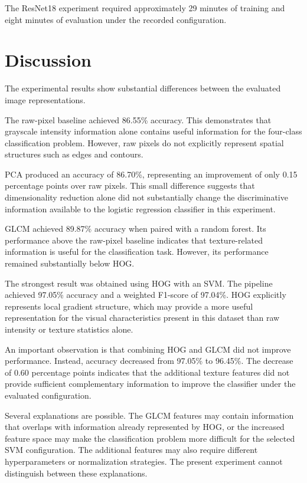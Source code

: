 \documentclass[11pt,a4paper]{article}
\begin{document}
The ResNet18 experiment required approximately 29 minutes of training and eight minutes of evaluation under the recorded configuration.


\section{Discussion}

The experimental results show substantial differences between the evaluated image representations.

The raw-pixel baseline achieved 86.55\% accuracy. This demonstrates that grayscale intensity information alone contains useful information for the four-class classification problem. However, raw pixels do not explicitly represent spatial structures such as edges and contours.

PCA produced an accuracy of 86.70\%, representing an improvement of only 0.15 percentage points over raw pixels. This small difference suggests that dimensionality reduction alone did not substantially change the discriminative information available to the logistic regression classifier in this experiment.

GLCM achieved 89.87\% accuracy when paired with a random forest. Its performance above the raw-pixel baseline indicates that texture-related information is useful for the classification task. However, its performance remained substantially below HOG.

The strongest result was obtained using HOG with an SVM. The pipeline achieved 97.05\% accuracy and a weighted F1-score of 97.04\%. HOG explicitly represents local gradient structure, which may provide a more useful representation for the visual characteristics present in this dataset than raw intensity or texture statistics alone.

An important observation is that combining HOG and GLCM did not improve performance. Instead, accuracy decreased from 97.05\% to 96.45\%. The decrease of 0.60 percentage points indicates that the additional texture features did not provide sufficient complementary information to improve the classifier under the evaluated configuration.

Several explanations are possible. The GLCM features may contain information that overlaps with information already represented by HOG, or the increased feature space may make the classification problem more difficult for the selected SVM configuration. The additional features may also require different hyperparameters or normalization strategies. The present experiment cannot distinguish between these explanations.
\end{document}
